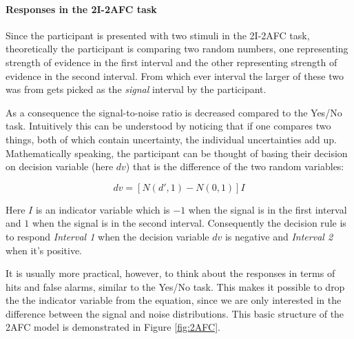 \documentclass{article}\usepackage{knitr}
\begin{document}
\paragraph{Responses in the 2I-2AFC task}

Since the participant is presented with two stimuli in the 2I-2AFC task, theoretically the participant is comparing two random numbers, one representing strength  of evidence in the first interval and the other representing strength of evidence in the second interval. From which ever interval the larger of these two was from gets picked as the \textit{signal} interval by the participant.

As a consequence the signal-to-noise ratio is decreased compared to the Yes/No task. Intuitively this can be understood by noticing that if one compares two things, both of which contain uncertainty, the individual uncertainties add up. Mathematically speaking, the participant can be thought of basing their decision on decision variable (here $dv$) that is the difference of the two random variables:

\begin{equation}
dv = [N(d', 1) - N(0, 1)] I
\end{equation}

Here $I$ is an indicator variable which  is $-1$ when the signal is in the first interval and $1$ when the signal is in the second interval. Consequently the decision rule is to respond \textit{Interval 1} when the decision variable $dv$ is negative and \textit{Interval 2} when it's positive. 

It is usually more practical, however, to think about the responses in terms of hits and false alarms, similar to the Yes/No task. This makes it possible to drop the the indicator variable from the equation, since we are only interested in the difference between the signal and noise distributions. This basic structure of the 2AFC model is demonstrated in Figure \ref{fig:2AFC}. 
\end{document}

